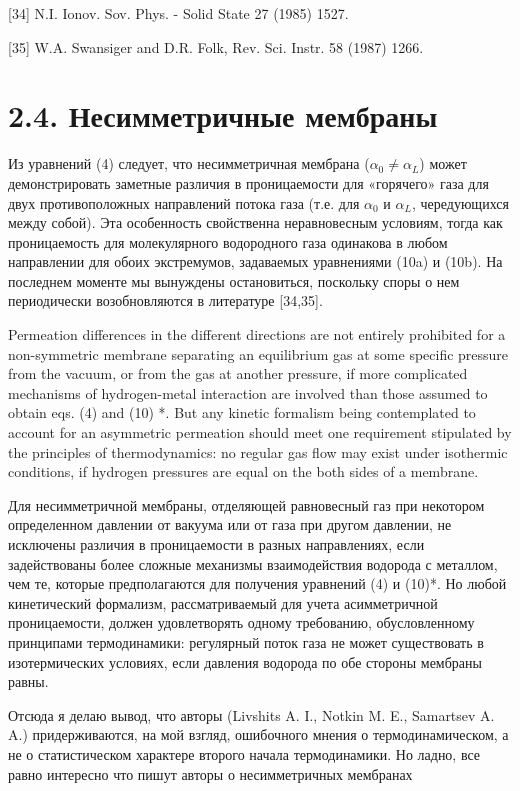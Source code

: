 \documentclass[11pt]{article}
\begin{document}
{[}34{]} N.I. Ionov. Sov. Phys. - Solid State 27 (1985) 1527.

{[}35{]} W.A. Swansiger and D.R. Folk, Rev. Sci. Instr. 58 (1987) 1266.

    \section{2.4. Несимметричные
мембраны}\label{ux43dux435ux441ux438ux43cux43cux435ux442ux440ux438ux447ux43dux44bux435-ux43cux435ux43cux431ux440ux430ux43dux44b}

Из уравнений (4) следует, что несимметричная мембрана
(\(\alpha_0 \neq \alpha_L\)) может демонстрировать заметные различия в
проницаемости для «горячего» газа для двух противоположных направлений
потока газа (т.е. для \(\alpha_0\) и \(\alpha_L\), чередующихся между
собой). Эта особенность свойственна неравновесным условиям, тогда как
проницаемость для молекулярного водородного газа одинакова в любом
направлении для обоих экстремумов, задаваемых уравнениями (10a) и (10b).
На последнем моменте мы вынуждены остановиться, поскольку споры о нем
периодически возобновляются в литературе {[}34,35{]}.

    Permeation differences in the different directions are not entirely
prohibited for a non-symmetric membrane separating an equilibrium gas at
some specific pressure from the vacuum, or from the gas at another
pressure, if more complicated mechanisms of hydrogen-metal interaction
are involved than those assumed to obtain eqs. (4) and (10) *. But any
kinetic formalism being contemplated to account for an asymmetric
permeation should meet one requirement stipulated by the principles of
thermodynamics: no regular gas flow may exist under isothermic
conditions, if hydrogen pressures are equal on the both sides of a
membrane.

    Для несимметричной мембраны, отделяющей равновесный газ при некотором
определенном давлении от вакуума или от газа при другом давлении, не
исключены различия в проницаемости в разных направлениях, если
задействованы более сложные механизмы взаимодействия водорода с
металлом, чем те, которые предполагаются для получения уравнений (4) и
(10)*. Но любой кинетический формализм, рассматриваемый для учета
асимметричной проницаемости, должен удовлетворять одному требованию,
обусловленному принципами термодинамики: регулярный поток газа не может
существовать в изотермических условиях, если давления водорода по обе
стороны мембраны равны.

    Отсюда я делаю вывод, что авторы (Livshits A. I., Notkin M. E.,
Samartsev A. A.) придерживаются, на мой взгляд, ошибочного мнения о
термодинамическом, а не о статистическом характере второго начала
термодинамики. Но ладно, все равно интересно что пишут авторы о
несимметричных мембранах
\end{document}
